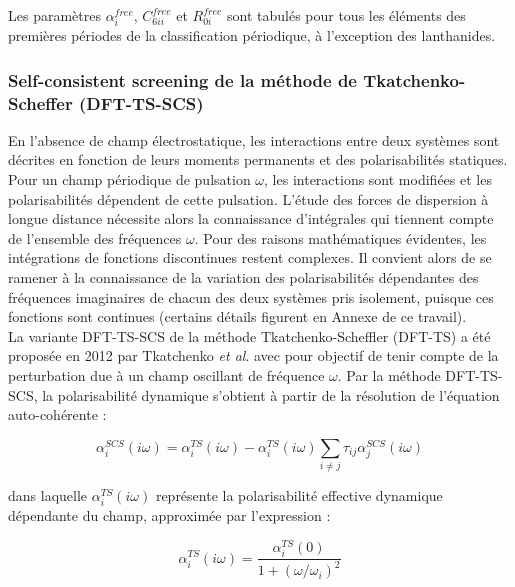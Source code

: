 {	Les paramètres $\alpha_{i}^{free}$, $C_{6ii}^{free}$ et $R_{0i}^{free}$ sont tabulés pour tous les éléments des premières périodes de la classification périodique, à l'exception des lanthanides.
	
	
	\subsubsection{Self-consistent screening de la méthode de Tkatchenko-Scheffer (DFT-TS-SCS)}
	
	En l'absence de champ électrostatique, les interactions entre deux systèmes sont décrites en fonction de leurs moments permanents et des polarisabilités statiques. Pour un champ périodique de pulsation $\omega$, les interactions sont modifiées et les polarisabilités dépendent de cette pulsation. L'étude des forces de dispersion à longue distance nécessite alors la connaissance d'intégrales qui tiennent compte de l'ensemble des fréquences $\omega$. Pour des raisons mathématiques évidentes, les intégrations de fonctions discontinues restent complexes. Il convient alors de se ramener à la connaissance de la variation des polarisabilités dépendantes des fréquences imaginaires de chacun des deux systèmes pris isolement, puisque ces fonctions sont continues (certains détails figurent en Annexe de ce travail). \\
	
	La variante DFT-TS-SCS de la méthode Tkatchenko-Scheffler (DFT-TS) a été proposée en 2012 par Tkatchenko \textit{et al}.\cite{tkatchenko2012accurate} avec pour objectif de tenir compte de la perturbation due à un champ oscillant de fréquence $\omega$. Par la méthode DFT-TS-SCS, la polarisabilité dynamique s'obtient à partir de la résolution de l’équation auto-cohérente :
	
	\begin{equation}
	\alpha_{i}^{SCS}(i \omega) = \alpha_{i}^{TS}(i \omega) - \alpha_{i}^{TS}(i \omega) \sum_{i\neq j} \tau_{ij} \alpha_{j}^{SCS}(i \omega)
	\end{equation} 
	
	dans laquelle $\alpha_{i}^{TS}(i \omega)$ représente la polarisabilité effective dynamique dépendante du champ, approximée par l’expression : 
	
	\begin{equation}
	\alpha_{i}^{TS}(i \omega) = \frac{\alpha_{i}^{TS}(0)}{1 + (\omega/\omega_{i})^{2}}
	\end{equation}
	
}
